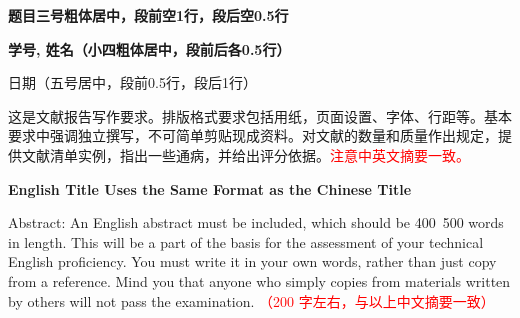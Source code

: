 \documentclass[a4paper,10.5pt,oweside]{article} %
\newcommand{\sanhao}{\fontsize{15.75pt}{\baselineskip}\selectfont}
\newcommand{\xiaosihao}{\fontsize{12pt}{\baselineskip}\selectfont}
\newcommand{\wuhao}{\fontsize{10.5pt}{\baselineskip}\selectfont}
\newcommand{\xiaowuhao}{\fontsize{9pt}{\baselineskip}\selectfont}
\theoremstyle{definition}
\numberwithin{equation}{section} %
\newcommand{\Title}[1]{\vspace{1ex} {\sanhao \bfseries #1}}
\newcommand{\AuthorID}[2]{\vspace{3.5ex} {\xiaosihao \bfseries #2,\: #1}}
\newcommand{\Date}[1]{\vspace{2ex} {\wuhao #1} \vspace{2ex}}
\newcommand{\Abstractcn}[2]{
        \begin{changemargin}{1cm}{1cm}
            {\xiaowuhao{\bfseries{摘\quad 要:\ }} #1 } \\ \vspace{1ex}
            {\xiaowuhao {\bfseries 关键词:} #2 }
        \end{changemargin}}
\newcommand{\Abstracten}[2]{
        \begin{changemargin}{1cm}{1cm}
            {\xiaowuhao{\bfseries{Abstract:}} #1 } \\ \vspace{1ex}
            {\xiaowuhao {\bfseries Key words:} #2 }
        \end{changemargin}}
\begin{document}
    \thispagestyle{empty} %




    \leavevmode %
    \begin{center}
        \vspace{1ex}

        \Title{题目三号粗体居中，段前空1行，段后空0.5行}

        \AuthorID{姓名（小四粗体居中，段前后各0.5行）}{学号}

        \Date{日期（五号居中，段前0.5行，段后1行） }

        \Abstractcn{这是文献报告写作要求。排版格式要求包括用纸，页面设置、字体、行距等。基本要求中强调独立撰写，不可简单剪贴现成资料。对文献的数量和质量作出规定，提供文献清单实例，指出一些通病，并给出评分依据。\textcolor{red}{注意中英文摘要一致。}}{}

        \vspace{3ex}

        \Title{English Title Uses the Same Format as the Chinese Title}

        \Abstracten{Abstract: An English abstract must be included, which should be 400~500 words in length. This will be a part of the basis for the assessment of your technical English proficiency. You must write it in your own words, rather than just copy from a reference. Mind you that anyone who simply copies from materials written by others will not pass the examination. \textcolor{red}{（200 字左右，与以上中文摘要一致）}}{}

    \end{center}
    \vspace{2ex}




    







    \titleformat{\section}{}{\thesection}{1em}{} %
\end{document}
